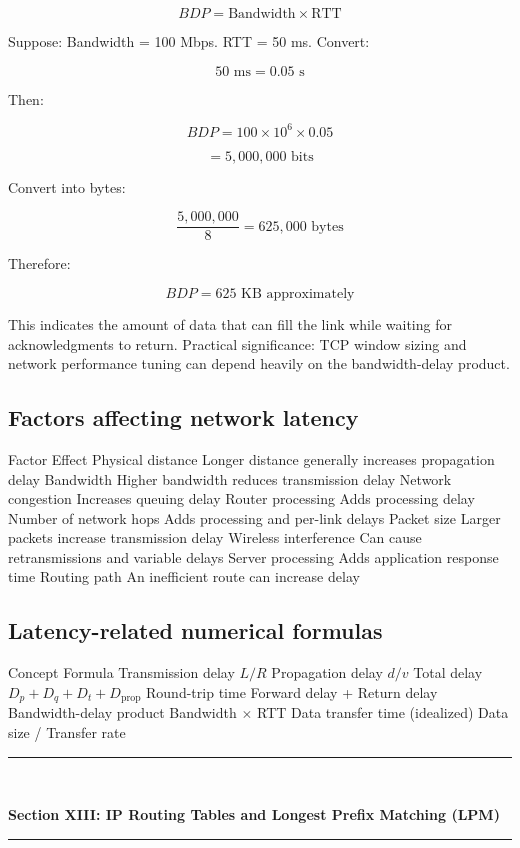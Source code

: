 \[
\boxed{BDP=\text{Bandwidth}\times\text{RTT}}
\]

Suppose:
Bandwidth = 100 Mbps.
RTT = 50 ms.
Convert:

\[
50\text{ ms}=0.05\text{ s}
\]

Then:

\[
BDP=100\times10^6\times0.05
\]


\[
=5,000,000\text{ bits}
\]

Convert into bytes:

\[
\frac{5,000,000}{8}=625,000\text{ bytes}
\]

Therefore:

\[
\boxed{BDP=625\text{ KB approximately}}
\]

This indicates the amount of data that can fill the link while waiting for acknowledgments to return.
Practical significance: TCP window sizing and network performance tuning can depend heavily on the bandwidth-delay product.
\subsection{Factors affecting network latency}
Factor
Effect
Physical distance
Longer distance generally increases propagation delay
Bandwidth
Higher bandwidth reduces transmission delay
Network congestion
Increases queuing delay
Router processing
Adds processing delay
Number of network hops
Adds processing and per-link delays
Packet size
Larger packets increase transmission delay
Wireless interference
Can cause retransmissions and variable delays
Server processing
Adds application response time
Routing path
An inefficient route can increase delay
\subsection{Latency-related numerical formulas}
Concept
Formula
Transmission delay
$L/R$
Propagation delay
$d/v$
Total delay
$D_p+D_q+D_t+D_{\text{prop}}$
Round-trip time
Forward delay + Return delay
Bandwidth-delay product
Bandwidth $\times$ RTT
Data transfer time (idealized)
Data size / Transfer rate

\newpage

\newpage
\begin{center}
\vspace{0.5em}
{\color{primary}\rule{0.45\textwidth}{1.2pt}\\[4pt]}
{\Large\bfseries\color{primary} Section XIII: IP Routing Tables and Longest Prefix Matching (LPM)\\[2pt]}
{\color{primary}\rule{0.45\textwidth}{1.2pt}}
\vspace{0.5em}
\end{center}

